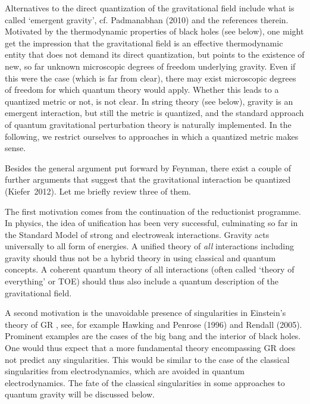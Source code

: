 \documentclass[12pt,a4paper]{article}
\begin{document}
Alternatives to the direct quantization of the gravitational field
include what is called `emergent gravity', cf. Padmanabhan (2010) and
the references therein. Motivated by the thermodynamic properties of
black holes (see below), one might get the impression that the
gravitational field is an effective thermodynamic entity that does
not demand its direct quantization, but points to the existence of
new, so far unknown microscopic degrees of freedom underlying
gravity. Even if this were the case (which is far from clear), there
may exist microscopic degrees of freedom for which quantum theory
would apply. Whether this leads to a quantized metric or not, is not
clear. In string theory (see below), gravity is an
emergent interaction, but still the metric is quantized, and the standard
approach of quantum 
gravitational perturbation theory is naturally implemented.  
In the following, we restrict ourselves to approaches in which a
quantized metric makes sense.

Besides the general argument put forward by Feynman, there exist a
couple of further arguments that suggest that the gravitational interaction
be quantized (Kiefer~2012). Let me briefly review three of them.

The first motivation comes from the continuation of the reductionist
programme. In physics, the idea of unification has been very
successful, culminating so far in the Standard Model of strong and
electroweak interactions. Gravity acts universally to all form of
energies. A unified theory of {\em all} interactions including gravity
should thus not be a hybrid theory in using classical and quantum
concepts. A coherent quantum theory of all interactions (often called
`theory of everything' or TOE) should thus also include a quantum
description of the gravitational field. 

A second motivation is the unavoidable presence of singularities in
Einstein's theory of GR , see, for example Hawking and Penrose (1996)
and Rendall (2005). Prominent examples are the cases of the big bang
and the interior of black holes. 
One would thus expect that a more fundamental
theory encompassing GR does not predict any singularities. This would
be similar to the case of the classical singularities from
electrodynamics, which are avoided in quantum electrodynamics.
The fate of
the classical singularities in some approaches to quantum gravity 
will be discussed below.
\end{document}
